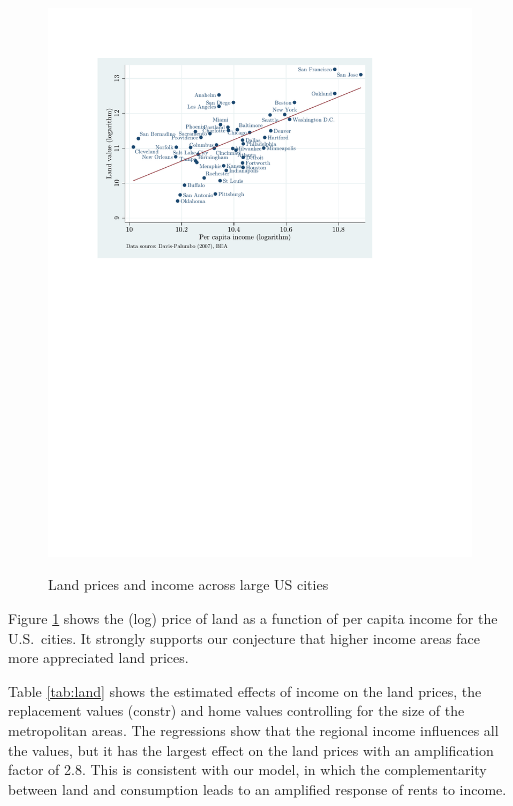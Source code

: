 \documentclass[12pt]{article}
\begin{document}
\begin{figure}[h!]
\centering
  \includegraphics[width=0.7\linewidth]{figures/sc_davis}\\
  \caption{Land prices and income across large US cities}\label{fig:land}
\end{figure}

Figure \ref{fig:land} shows the (log) price of land as a function of
per capita income for the U.S.~cities. It strongly supports our
conjecture that higher income areas face more appreciated land
prices.

Table \ref{tab:land} shows the estimated effects of income on the
land prices, the replacement values (constr) and home values
controlling for the size of the metropolitan areas. The regressions
show that the regional income influences all the values, but it has
the largest effect on the land prices with an amplification factor
of 2.8. This is consistent with our model, in which the complementarity between land and consumption leads to an amplified response of rents to income.
\end{document}
